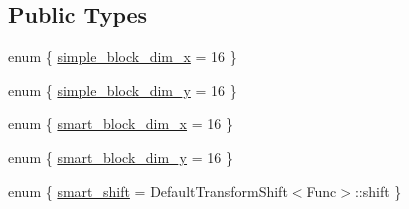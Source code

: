 \subsection*{Public Types}
\begin{DoxyCompactItemize}
\item 
enum \{ \hyperlink{structcv_1_1gpu_1_1device_1_1DefaultTransformFunctorTraits_a2f88d072f1375d2006edc5590ba3f3b2afd1d20a0cbff9448f29468e9d1eac46c}{simple\-\_\-block\-\_\-dim\-\_\-x} = 16
 \}
\item 
enum \{ \hyperlink{structcv_1_1gpu_1_1device_1_1DefaultTransformFunctorTraits_aac0773efe43f06f8612306971eb800c4a5eeb0f4ae92c9fa0780cb5c28ea65bbc}{simple\-\_\-block\-\_\-dim\-\_\-y} = 16
 \}
\item 
enum \{ \hyperlink{structcv_1_1gpu_1_1device_1_1DefaultTransformFunctorTraits_ae1923c3c991378f468f34dddb62e819ca295ea4a2fe9b078d8c239f4e998d4888}{smart\-\_\-block\-\_\-dim\-\_\-x} = 16
 \}
\item 
enum \{ \hyperlink{structcv_1_1gpu_1_1device_1_1DefaultTransformFunctorTraits_a542590eeb3a3ea18734286e0ab8fc308aa2c3c4a8090544328bdc179111a7d777}{smart\-\_\-block\-\_\-dim\-\_\-y} = 16
 \}
\item 
enum \{ \hyperlink{structcv_1_1gpu_1_1device_1_1DefaultTransformFunctorTraits_a0e772dd2fd1430a6c248e16965b8224da365d42b8e83f777a631ff0e60a9e6e53}{smart\-\_\-shift} = Default\-Transform\-Shift$<$Func$>$\-:\-:shift
 \}
\end{DoxyCompactItemize}



